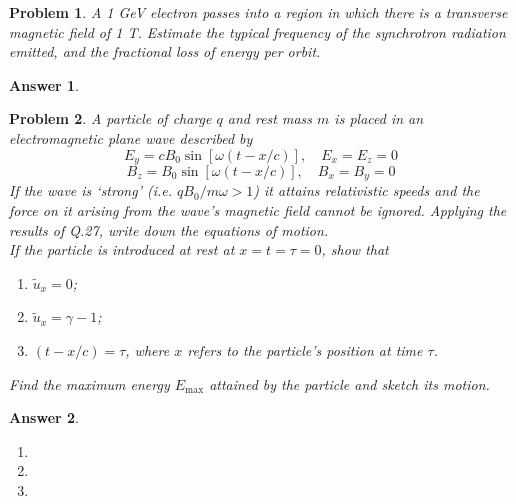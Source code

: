 \documentclass[a4paper]{article}
\newtheorem{ans}{Answer}
\theoremstyle{new}
\newtheorem{qns}{Problem}
\begin{document}
\begin{qns}
A 1 GeV electron passes into a region in which there is a transverse magnetic field of 1 T. Estimate the typical frequency of the synchrotron radiation emitted, and the fractional loss of energy per orbit.
\end{qns}
\begin{ans}

\end{ans}
\newpage
\begin{qns}
A particle of charge $q$ and rest mass $m$ is placed in an electromagnetic plane wave described by
$$E_y=cB_0\sin[\omega(t-x/c)],\quad E_x=E_z=0$$
$$B_z=B_0\sin[\omega(t-x/c)],\quad B_x=B_y=0$$
If the wave is `strong' (i.e. $qB_0/m\omega > 1$) it attains relativistic speeds and the force on it arising from the wave’s magnetic field cannot be ignored. Applying the results of Q.27, write down the equations of motion.\\[5pt]
If the particle is introduced at rest at $x = t = \tau = 0$, show that
\begin{enumerate}[label=(\alph*)]
\item $\tilde{u}_x=0$;
\item $\tilde{u}_x=\gamma-1$;
\item$(t-x/c)=\tau$, where $x$ refers to the particle's position at time $\tau$.
\end{enumerate}
Find the maximum energy $E_{\text{max}}$ attained by the particle and sketch its motion.
\end{qns}
\begin{ans}\leavevmode
\begin{enumerate}[label=(\alph*)]
\item 
\item 
\item
\end{enumerate}
\end{ans}
\end{document}
